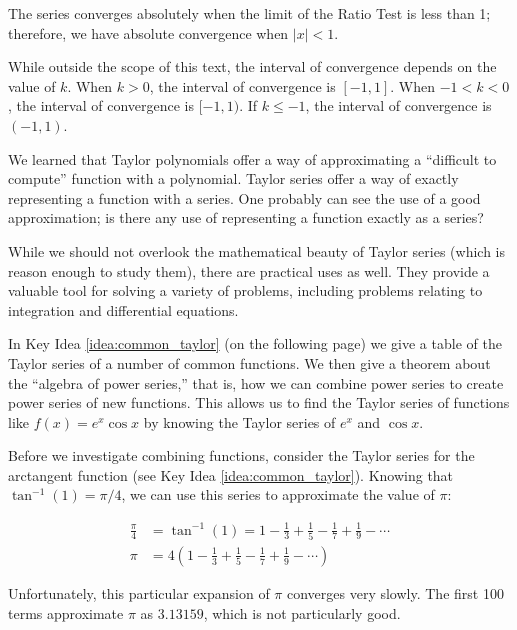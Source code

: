 {The series converges absolutely when the limit of the Ratio Test is less than 1; therefore, we have absolute convergence when $|x|<1$. 

While outside the scope of this text, the interval of convergence depends on the value of $k$. When $k>0$, the interval of convergence is $[-1,1]$. When $-1<k<0$, the interval of convergence is $[-1,1)$. If $k\leq -1$, the interval of convergence is $(-1,1)$.
}

We learned that Taylor polynomials offer a way of approximating a ``difficult to compute'' function with a polynomial. Taylor series offer a way of exactly representing a function with a series. One probably can see the use of a good approximation; is there any use of representing a function exactly as a series?

While we should not overlook the mathematical beauty of Taylor series (which is reason enough to study them), there are practical uses as well. They provide a valuable tool for solving a variety of problems, including problems relating to integration and differential equations.

In Key Idea \ref{idea:common_taylor} (on the following page) we give  a table of the Taylor series of a number of common functions. We then give a theorem about the ``algebra of power series,'' that is, how we can combine power series to create power series of new functions. This allows us to find the Taylor series of functions like $f(x) = e^x\cos x$ by knowing the Taylor series of $e^x$ and $\cos x$.

Before we investigate combining functions, consider the Taylor series for the arctangent function (see Key Idea \ref{idea:common_taylor}). Knowing that $\tan^{-1}(1) = \pi/4$, we can use this series to approximate the value of $\pi$:

\begin{align*}
\frac{\pi}4 &= \tan^{-1}(1) = 1-\frac13+\frac15-\frac17+\frac19-\cdots\\
\pi &= 4\left(1-\frac13+\frac15-\frac17+\frac19-\cdots\right)
\end{align*} 

Unfortunately, this particular expansion of $\pi$ converges very slowly. The first 
100 terms approximate $\pi$ as $3.13159$, which is not particularly good.


